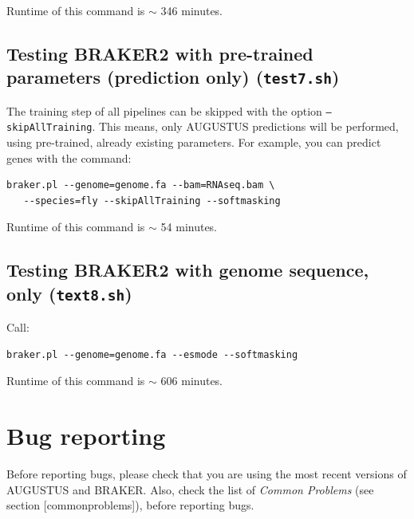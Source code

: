 \documentclass[]{article}
\begin{document}
Runtime of this command is \(\sim\) 346 minutes.

\hypertarget{testing-braker2-with-pre-trained-parameters-prediction-only-test7.sh}{\subsection{\texorpdfstring{Testing
BRAKER2 with pre-trained parameters (prediction only)
(\texttt{test7.sh})}{Testing BRAKER2 with pre-trained parameters (prediction only) (test7.sh)}}\label{testing-braker2-with-pre-trained-parameters-prediction-only-test7.sh}}

The training step of all pipelines can be skipped with the option
\texttt{–skipAllTraining}. This means, only AUGUSTUS predictions will be
performed, using pre-trained, already existing parameters. For example,
you can predict genes with the command:

\begin{verbatim}
braker.pl --genome=genome.fa --bam=RNAseq.bam \
   --species=fly --skipAllTraining --softmasking
\end{verbatim}

Runtime of this command is \(\sim\) 54 minutes.

\hypertarget{testing-braker2-with-genome-sequence-only-text8.sh}{\subsection{\texorpdfstring{Testing
BRAKER2 with genome sequence, only
(\texttt{text8.sh})}{Testing BRAKER2 with genome sequence, only (text8.sh)}}\label{testing-braker2-with-genome-sequence-only-text8.sh}}

Call:

\begin{verbatim}
braker.pl --genome=genome.fa --esmode --softmasking
\end{verbatim}

Runtime of this command is \(\sim\) 606 minutes.

\hypertarget{bug-reporting}{\section{Bug
reporting}\label{bug-reporting}}

Before reporting bugs, please check that you are using the most recent
versions of AUGUSTUS and BRAKER. Also, check the list of \emph{Common
Problems} (see section {[}commonproblems{]}), before reporting bugs.
\end{document}

